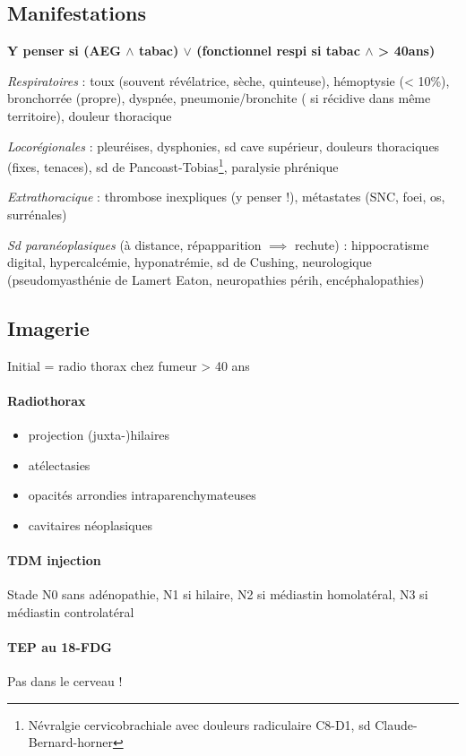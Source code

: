 \documentclass{article}
\begin{document}
\subsection{Manifestations}
\textbf{Y penser si (AEG $\wedge$ tabac) $\vee$ (fonctionnel respi si tabac $\wedge$ >
  40ans)}

\textit{Respiratoires}  : toux (souvent révélatrice, sèche, quinteuse), hémoptysie (<
10\%), bronchorrée (propre), dyspnée, pneumonie/bronchite (\danger{} si récidive
dans même territoire), douleur thoracique 

\textit{Locorégionales}  : pleuréises, dysphonies, sd cave supérieur, douleurs thoraciques
(fixes, tenaces), sd de Pancoast-Tobias\footnote{Névralgie cervicobrachiale avec
  douleurs radiculaire C8-D1, sd Claude-Bernard-horner}, paralysie phrénique

\textit{Extrathoracique}  : thrombose inexpliques (y penser !), métastates (SNC,
foei, os, surrénales)

\textit{Sd paranéoplasiques} (à distance, répapparition $\implies$ rechute) :
hippocratisme digital, hypercalcémie, hyponatrémie, sd de Cushing, neurologique
(pseudomyasthénie de Lamert Eaton, neuropathies périh, encéphalopathies)

\subsection{Imagerie}
Initial = radio thorax chez fumeur > 40 ans
\paragraph{Radiothorax}
\begin{itemize}
\item projection (juxta-)hilaires
\item atélectasies
\item opacités arrondies intraparenchymateuses
\item cavitaires néoplasiques
\end{itemize}

\paragraph{TDM injection}
Stade N0 sans adénopathie, N1 si hilaire, N2 si médiastin homolatéral, N3 si médiastin
controlatéral

\paragraph{TEP au 18-FDG}
Pas dans le cerveau !
\end{document}
